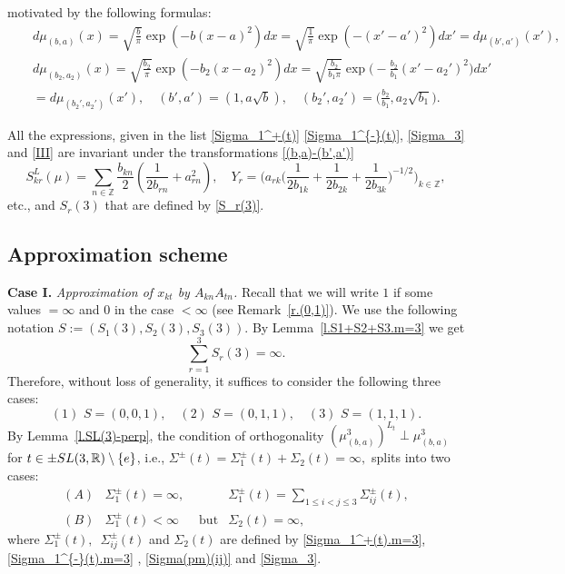\documentclass[preprint,12pt]{elsarticle}
\newcommand{\commA}[1]{\marginpar{%
\begin{color}{red}
\vskip-\baselineskip %
\raggedright\footnotesize
\itshape\hrule \smallskip A: #1\par\smallskip\hrule\end{color}}}
\numberwithin{equation}{section}
\begin{document}
motivated by
the following formulas:
\begin{eqnarray*}
&&d\mu_{(b,a)}(x)\!=\!\sqrt{\frac{b}{\pi}}
\exp(-b(x\!-\!a)^2)dx\!=\!\sqrt{\frac{1}{\pi}}
\exp(-(x'\!-\!a')^2)dx'\!=\!d\mu_{(b',a')}(x'),\\
&&d\mu_{(b_2,a_2)}(x)=\sqrt{\frac{b_2}{\pi}}
\exp(-b_2(x\!-\!a_2)^2)dx=\sqrt{\frac{b_2}{b_1\pi}}
\exp\Big(-\frac{b_2}{b_1}(x'\!-\!a_2')^2\Big)dx'\\
&&=d\mu_{(b_2',a_2')}(x'),\quad (b',a')=(1,a\sqrt{b}),\quad (b_2',a_2')=\Big(\frac{b_2}{b_1},a_2\sqrt{b_1}\Big).
\end{eqnarray*}
%
\begin{rem}
\label{r.(b,a)-(b',a')} 
All the expressions, given in  the list \eqref{Sigma_1^+(t)} \eqref{Sigma_1^{-}(t)},  \eqref{Sigma_3} and \eqref{III} 
are invariant under the transformations \eqref{(b,a)-(b',a')}
$$
S^L_{kr}(\mu)=\sum_{n\in {\mathbb Z}}
\frac{b_{kn}}{2}\left(\frac{1}{2b_{rn}}+a_{rn}^2\right),\quad 
Y_r=\Big(a_{rk}\Big(\frac{1}{2b_{1k}}+\frac{1}{2b_{2k}}+\frac{1}{2b_{3k}}\Big)^{-1/2}\Big)_{k\in{\mathbb Z}},
$$
etc., and $S_r(3)$ that are defined by \eqref{S_r(3)}.
\end{rem}


\subsection{Approximation scheme}
%
{\bf Case I.}
{\it  Approximation of $x_{kt}$ by $A_{kn}A_{tn}$.}
%
Recall that  we will write $1$ if some values  $=\infty$ and $0$ in the case $<\infty$ (see Remark~\ref{r.(0,1)}).
%
We use the following notation $S:=(S_1(3), S_2(3),S_3(3))$.
%
By Lemma~\ref{l.S1+S2+S3.m=3} we get $$\sum_{r=1}^3S_r(3)=\infty.$$ 
%
Therefore, without loss of generality, it suffices to consider the following
three cases:
%
\begin{equation}
\label{S=1,2,3} 
(1)\,\,S=(0,0,1),\quad (2)\,\,S=(0,1,1),\quad (3)\,\,S=(1,1,1).
\end{equation}
%
By Lemma~\ref{l.SL(3)-perp}, 
the condition of orthogonality $(\mu_{(b,a)}^3)^{L_t}\perp\mu_{(b,a)}^3$ 
for   $t\in \pm{\rm SL}(3,\mathbb R)\setminus\{e\}$, i.e.,
$
\Sigma^{\pm}(t)=\Sigma_1^{\pm}(t)+\Sigma_2(t)=\infty,
$
splits into two cases:
\begin{equation}
\label{A,B.3}
\begin{array}{cccc}
(A) & \Sigma_1^{\pm}(t)=\infty,&& \Sigma_1^{\pm}(t)
=\sum_{1\leq i< j\leq 3}\Sigma^{\pm}_{ij}(t),\\
(B) &\Sigma_1^{\pm}(t)<\infty&\text{ but}& \Sigma_2(t)=\infty,
\end{array}
\end{equation}
%
where $\Sigma_1^\pm(t),\,$ $\Sigma^{\pm}_{ij}(t)$ and $\Sigma_2(t)$ are defined by \eqref{Sigma_1^+(t).m=3},
\eqref{Sigma_1^{-}(t).m=3} , \eqref{Sigma(pm)(ij)} and \eqref{Sigma_3}.
%
\end{document}
